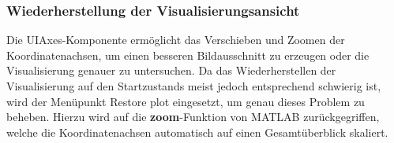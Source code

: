 \subsubsection{Wiederherstellung der Visualisierungsansicht}

Die UIAxes-Komponente ermöglicht das Verschieben und Zoomen der Koordinatenachsen, um einen besseren Bildausschnitt zu erzeugen oder die Visualisierung genauer zu untersuchen. Da das Wiederherstellen der Visualisierung auf den Startzustands meist jedoch entsprechend schwierig ist, wird der Menüpunkt \glqq Restore plot\grqq{} eingesetzt, um genau dieses Problem zu beheben. Hierzu wird auf die \textbf{zoom}-Funktion von MATLAB zurückgegriffen, welche die Koordinatenachsen automatisch auf einen Gesamtüberblick skaliert.

\begin{minipage}{\linewidth}

\end{minipage}